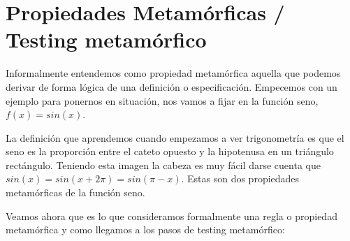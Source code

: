\vspace{10pt}

\section{Propiedades Metamórficas / Testing metamórfico}

Informalmente entendemos como propiedad metamórfica aquella que podemos derivar de forma lógica de una definición o especificación. Empecemos con un ejemplo para ponernos en situación, nos vamos a fijar en la función seno, $f(x)=sin(x)$.\newline

La definición que aprendemos cuando empezamos a ver trigonometría es que el seno es la proporción entre el cateto opuesto y la hipotenusa en un triángulo rectángulo. Teniendo esta imagen la cabeza es muy fácil darse cuenta que $sin(x)=sin(x + 2\pi)=sin(\pi-x)$. Estas son dos propiedades metamórficas de la función seno. \newline

Veamos ahora que es lo que consideramos formalmente una regla o propiedad metamórfica y como llegamos a los pasos de testing metamórfico\cite{AR:MTmain:2008}:\newline

